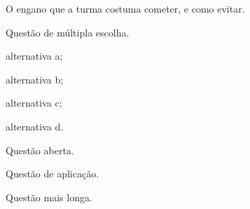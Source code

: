\documentclass{notaaula}        %
\begin{document}
\begin{dica}
O engano que a turma costuma cometer, e como evitar.
\end{dica}

\begin{exercicios}
\begin{questoes}
\item Questão de múltipla escolha.
  \begin{alternativas}
  \item alternativa a;
  \item alternativa b;
  \item alternativa c;
  \item alternativa d.
  \end{alternativas}
\item Questão aberta.
\end{questoes}

\begin{questoes}
\item Questão de aplicação.
\end{questoes}

\begin{questoes}
\item Questão mais longa.
\end{questoes}

\end{exercicios}
\end{document}
